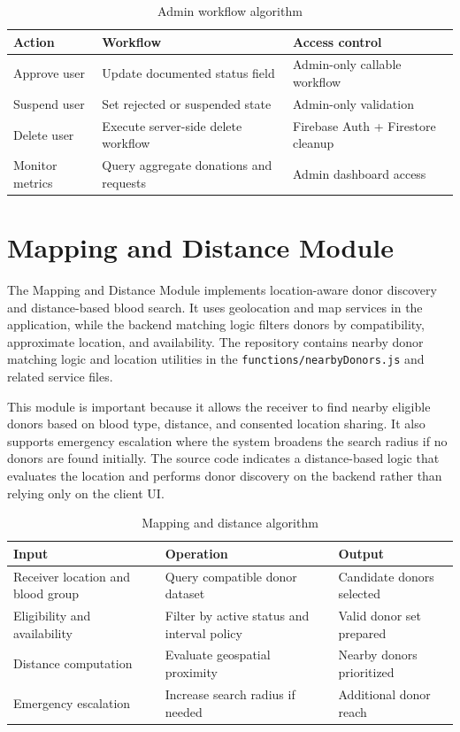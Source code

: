 \begin{table}[H]
\centering
\caption{Admin workflow algorithm}
\begin{tabularx}{\textwidth}{|p{4.0cm}|X|p{4.0cm}|}
\hline
\textbf{Action} & \textbf{Workflow} & \textbf{Access control} \\
\hline
Approve user & Update documented status field & Admin-only callable workflow \\
\hline
Suspend user & Set rejected or suspended state & Admin-only validation \\
\hline
Delete user & Execute server-side delete workflow & Firebase Auth + Firestore cleanup \\
\hline
Monitor metrics & Query aggregate donations and requests & Admin dashboard access \\
\hline
\end{tabularx}
\end{table}


\section{Mapping and Distance Module}

The Mapping and Distance Module implements location-aware donor discovery and distance-based blood search. It uses geolocation and map services in the application, while the backend matching logic filters donors by compatibility, approximate location, and availability. The repository contains nearby donor matching logic and location utilities in the \texttt{functions/nearbyDonors.js} and related service files.

This module is important because it allows the receiver to find nearby eligible donors based on blood type, distance, and consented location sharing. It also supports emergency escalation where the system broadens the search radius if no donors are found initially. The source code indicates a distance-based logic that evaluates the location and performs donor discovery on the backend rather than relying only on the client UI.

\begin{table}[H]
\centering
\caption{Mapping and distance algorithm}
\begin{tabularx}{\textwidth}{|p{4.0cm}|X|p{4.0cm}|}
\hline
\textbf{Input} & \textbf{Operation} & \textbf{Output} \\
\hline
Receiver location and blood group & Query compatible donor dataset & Candidate donors selected \\
\hline
Eligibility and availability & Filter by active status and interval policy & Valid donor set prepared \\
\hline
Distance computation & Evaluate geospatial proximity & Nearby donors prioritized \\
\hline
Emergency escalation & Increase search radius if needed & Additional donor reach \\
\hline
\end{tabularx}
\end{table}

